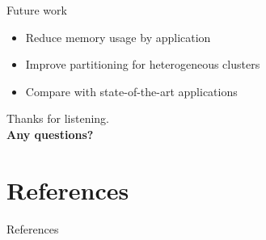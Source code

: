 \documentclass[aspectratio=43,t]{beamer}
\begin{document}
  \begin{frame}{Future work}
    \begin{block}{}
      \begin{itemize}
        \item Reduce memory usage by application
        \item Improve partitioning for heterogeneous clusters
        \item Compare with state-of-the-art applications
      \end{itemize}
    \end{block}
  \end{frame}

  { %
    \begin{frame}[c,noframenumbering]
      \begin{center}
        Thanks for listening.\\
        {\bf Any questions?}
      \end{center}
    \end{frame}

    \section*{References}
    \begin{frame}{References}
      \printbibliography
    \end{frame}
  }
\end{document}
